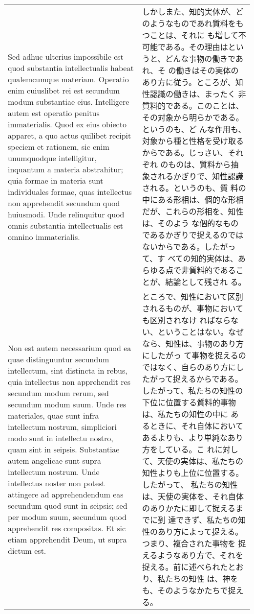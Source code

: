 \documentclass[10pt]{jsarticle} %
\begin{document}
\begin{longtable}{p{21em}p{21em}}
\\



Sed adhuc ulterius impossibile est quod substantia intellectualis
habeat qualemcumque materiam. Operatio enim cuiuslibet rei est
secundum modum substantiae eius. Intelligere autem est operatio
penitus immaterialis. Quod ex eius obiecto apparet, a quo actus
quilibet recipit speciem et rationem, sic enim unumquodque
intelligitur, inquantum a materia abstrahitur; quia formae in materia
sunt individuales formae, quas intellectus non apprehendit secundum
quod huiusmodi. Unde relinquitur quod omnis substantia intellectualis
est omnino immaterialis.


&

 しかしまた、知的実体が、どのようなものであれ質料をもつことは、それに
 も増して不可能である。その理由はというと、どんな事物の働きであれ、そ
 の働きはその実体のあり方に従う。ところが、知性認識の働きは、まったく
 非質料的である。このことは、その対象から明らかである。というのも、ど
 んな作用も、対象から種と性格を受け取るからである。じっさい、それぞれ
 のものは、質料から抽象されるかぎりで、知性認識される。というのも、質
 料の中にある形相は、個的な形相だが、これらの形相を、知性は、そのよう
 な個的なものであるかぎりで捉えるのではないからである。したがって、す
 べての知的実体は、あらゆる点で非質料的であることが、結論として残され
 る。

\\



Non est autem necessarium quod ea quae distinguuntur secundum
intellectum, sint distincta in rebus, quia intellectus non apprehendit
res secundum modum rerum, sed secundum modum suum. Unde res
materiales, quae sunt infra intellectum nostrum, simpliciori modo sunt
in intellectu nostro, quam sint in seipsis. Substantiae autem
angelicae sunt supra intellectum nostrum. Unde intellectus noster non
potest attingere ad apprehendendum eas secundum quod sunt in seipsis;
sed per modum suum, secundum quod apprehendit res compositas. Et sic
etiam apprehendit Deum, ut supra dictum est.


&

ところで、知性において区別されるものが、事物においても区別されなけ
 ればならない、ということはない。なぜなら、知性は、事物のあり方にしたがっ
 て事物を捉えるのではなく、自らのあり方にしたがって捉えるからである。
したがって、私たちの知性の下位に位置する質料的事物は、私たちの知性の中に
 あるときに、それ自体においてあるよりも、より単純なあり方をしている。こ
 れに対して、天使の実体は、私たちの知性よりも上位に位置する。したがって、
 私たちの知性は、天使の実体を、それ自体のありかたに即して捉えるまでに到
 達できず、私たちの知性のあり方によって捉える。つまり、複合された事物を
 捉えるようなあり方で、それを捉える。前に述べられたとおり、私たちの知性
 は、神をも、そのようなかたちで捉える。



\end{longtable}
\end{document}
